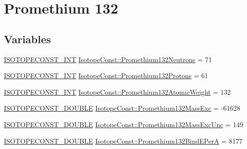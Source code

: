 \hypertarget{group___isotope_const-_promethium-_pm132}{}\section{Promethium 132}
\label{group___isotope_const-_promethium-_pm132}
\subsection*{Variables}
\begin{DoxyCompactItemize}
\item 
\mbox{\hyperlink{group___isotope_const-_macros_ga5f18360b3e99483a35c32d789e62621c}{I\+S\+O\+T\+O\+P\+E\+C\+O\+N\+S\+T\+\_\+\+I\+NT}} \mbox{\hyperlink{group___isotope_const-_promethium-_pm132_gab3bd0ca20a35251203f1e0a31bbff29e}{Isotope\+Const\+::\+Promethium132\+Neutrons}} = 71
\item 
\mbox{\hyperlink{group___isotope_const-_macros_ga5f18360b3e99483a35c32d789e62621c}{I\+S\+O\+T\+O\+P\+E\+C\+O\+N\+S\+T\+\_\+\+I\+NT}} \mbox{\hyperlink{group___isotope_const-_promethium-_pm132_ga03c6bcd6d0a9ab53d6c83a870ca3c40b}{Isotope\+Const\+::\+Promethium132\+Protons}} = 61
\item 
\mbox{\hyperlink{group___isotope_const-_macros_ga5f18360b3e99483a35c32d789e62621c}{I\+S\+O\+T\+O\+P\+E\+C\+O\+N\+S\+T\+\_\+\+I\+NT}} \mbox{\hyperlink{group___isotope_const-_promethium-_pm132_ga703fb36cd752b4f14e1c11f409abe3de}{Isotope\+Const\+::\+Promethium132\+Atomic\+Weight}} = 132
\item 
\mbox{\hyperlink{group___isotope_const-_macros_ga8f45a7272ce02c0b4c65c44636ed719a}{I\+S\+O\+T\+O\+P\+E\+C\+O\+N\+S\+T\+\_\+\+D\+O\+U\+B\+LE}} \mbox{\hyperlink{group___isotope_const-_promethium-_pm132_gaa478dc081db8febee3966708d8466c08}{Isotope\+Const\+::\+Promethium132\+Mass\+Exc}} = -\/61628
\item 
\mbox{\hyperlink{group___isotope_const-_macros_ga8f45a7272ce02c0b4c65c44636ed719a}{I\+S\+O\+T\+O\+P\+E\+C\+O\+N\+S\+T\+\_\+\+D\+O\+U\+B\+LE}} \mbox{\hyperlink{group___isotope_const-_promethium-_pm132_ga242999d3d6cde663f493fede1d6402df}{Isotope\+Const\+::\+Promethium132\+Mass\+Exc\+Unc}} = 149
\item 
\mbox{\hyperlink{group___isotope_const-_macros_ga8f45a7272ce02c0b4c65c44636ed719a}{I\+S\+O\+T\+O\+P\+E\+C\+O\+N\+S\+T\+\_\+\+D\+O\+U\+B\+LE}} \mbox{\hyperlink{group___isotope_const-_promethium-_pm132_ga6aaf4787aab689a02f2a6f9516f61084}{Isotope\+Const\+::\+Promethium132\+Bind\+E\+PerA}} = 8177
\item 

\end{DoxyCompactItemize}
